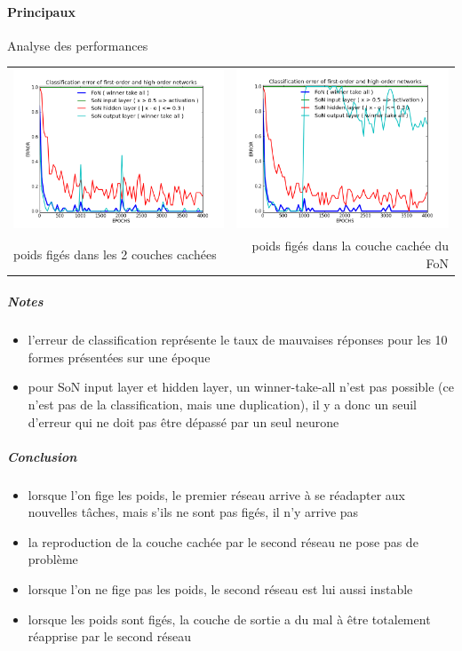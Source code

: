     \paragraph{Principaux}
      Analyse des performances
      \begin{center}
	\begin{tabular}{lr}
	  \hspace*{-1cm}
	  \includegraphics[width=250px]{data/expB4/err_bb.png}
	  &
	  \includegraphics[width=250px]{data/expB4/err_block.png} \\
	  poids figés dans les 2 couches cachées
	  &
	  poids figés dans la couche cachée du FoN
	\end{tabular}
      \end{center}
      \subparagraph{Notes}
	\begin{itemize}
	  \item l'erreur de classification représente le taux de mauvaises réponses pour les 10 formes présentées sur une époque
	  \item pour SoN input layer et hidden layer, un winner-take-all n'est pas possible (ce n'est pas de la classification, 
	  mais une duplication), il y a donc un seuil d'erreur qui ne doit pas être dépassé par un seul neurone
	\end{itemize}
      \subparagraph{Conclusion}
	\begin{itemize}
	  \item lorsque l'on fige les poids, le premier réseau arrive à se réadapter aux nouvelles tâches, mais s'ils ne sont
	  pas figés, il n'y arrive pas
	  \item la reproduction de la couche cachée par le second réseau ne pose pas de problème
	  \item lorsque l'on ne fige pas les poids, le second réseau est lui aussi instable
	  \item lorsque les poids sont figés, la couche de sortie a du mal à être totalement réapprise par le second réseau
	  
	\end{itemize}
